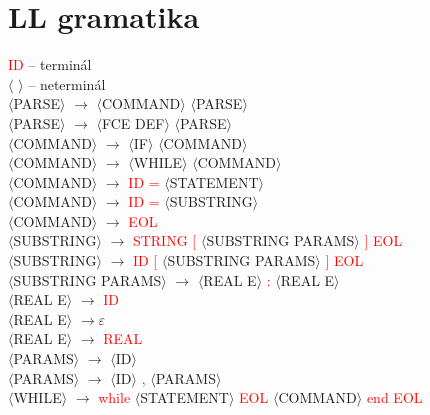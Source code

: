 \documentclass[12pt,a4paper,titlepage,final]{article}
\begin{document}
\newpage
\section{LL gramatika}

  \textcolor{red} {ID}  -- terminál \\
   $\langle$ $\rangle$ -- neterminál \\
   $\langle$PARSE$\rangle$ $\rightarrow$ $\langle$COMMAND$\rangle$ $\langle$PARSE$\rangle$ \\
   $\langle$PARSE$\rangle$ $\rightarrow$ $\langle$FCE DEF$\rangle$ $\langle$PARSE$\rangle$ \\
   $\langle$COMMAND$\rangle$ $\rightarrow$ $\langle$IF$\rangle$ $\langle$COMMAND$\rangle$ \\
   $\langle$COMMAND$\rangle$ $\rightarrow$ $\langle$WHILE$\rangle$ $\langle$COMMAND$\rangle$ \\
   $\langle$COMMAND$\rangle$ $\rightarrow$  \textcolor{red} {ID}  \textcolor{red} {=} $\langle$STATEMENT$\rangle$ \\
   $\langle$COMMAND$\rangle$ $\rightarrow$  \textcolor{red} {ID}  \textcolor{red} {=} $\langle$SUBSTRING$\rangle$ \\
   $\langle$COMMAND$\rangle$ $\rightarrow$  \textcolor{red} {EOL}  \\
   $\langle$SUBSTRING$\rangle$ $\rightarrow$  \textcolor{red} {STRING}  \textcolor{red} {[} $\langle$SUBSTRING PARAMS$\rangle$ \textcolor{red} {]}  \textcolor{red} {EOL}  \\
   $\langle$SUBSTRING$\rangle$ $\rightarrow$  \textcolor{red} {ID}  \textcolor{red} {[} $\langle$SUBSTRING PARAMS$\rangle$ \textcolor{red} {]}  \textcolor{red} {EOL}  \\
   $\langle$SUBSTRING PARAMS$\rangle$ $\rightarrow$ $\langle$REAL E$\rangle$ \textcolor{red} {:} $\langle$REAL E$\rangle$ \\
   $\langle$REAL E$\rangle$ $\rightarrow$  \textcolor{red} {ID}  \\
   $\langle$REAL E$\rangle$ $\rightarrow \varepsilon$ \\
   $\langle$REAL E$\rangle$ $\rightarrow$  \textcolor{red} {REAL}  \\
   $\langle$PARAMS$\rangle$ $\rightarrow$ $\langle$ID$\rangle$ \\
   $\langle$PARAMS$\rangle$ $\rightarrow$ $\langle$ID$\rangle$ \textcolor{red} {,} $\langle$PARAMS$\rangle$ \\
   $\langle$WHILE$\rangle$ $\rightarrow$  \textcolor{red} {while} $\langle$STATEMENT$\rangle$ \textcolor{red} {EOL} $\langle$COMMAND$\rangle$ \textcolor{red} {end}  \textcolor{red} {EOL}  \\
\end{document}
